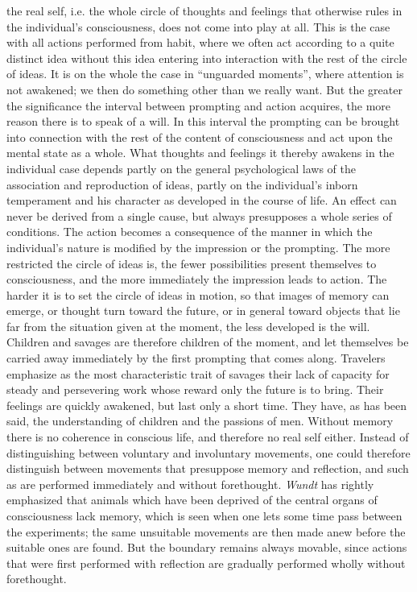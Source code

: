 \documentclass[12pt,a4paper,openany]{book}
\newcommand{\opage}[1]{\marginnote{\footnotesize\textit{[#1]}}}
\begin{document}
the real self, i.e. the whole circle of thoughts and feelings that otherwise
rules in the individual's consciousness, does not come into play at all. This
is the case with all actions performed from habit, where we often act
according to a quite distinct idea without this idea entering into interaction
with the rest of the circle of ideas. It is on the whole the case in
``unguarded moments'', where attention is not awakened; we then do something
other than we really want. But the greater the significance the interval
between prompting and action acquires, the more reason there is to speak of a
will. In this interval the prompting can be brought into connection with the
rest of the content of consciousness and act upon the mental state as a whole.
What thoughts and feelings \opage{115}it thereby awakens in the individual
case depends partly on the general psychological laws of the association and
reproduction of ideas, partly on the individual's inborn temperament and his
character as developed in the course of life. An effect can never be derived
from a single cause, but always presupposes a whole series of conditions. The
action becomes a consequence of the manner in which the individual's nature is
modified by the impression or the prompting. The more restricted the circle of
ideas is, the fewer possibilities present themselves to consciousness, and the
more immediately the impression leads to action. The harder it is to set the
circle of ideas in motion, so that images of memory can emerge, or thought
turn toward the future, or in general toward objects that lie far from the
situation given at the moment, the less developed is the will. Children and
savages are therefore children of the moment, and let themselves be carried
away immediately by the first prompting that comes along. Travelers emphasize
as the most characteristic trait of savages their lack of capacity for steady
and persevering work whose reward only the future is to bring. Their feelings
are quickly awakened, but last only a short time. They have, as has been said,
the understanding of children and the passions of men. Without memory there is
no coherence in conscious life, and therefore no real self either. Instead of
distinguishing between voluntary and involuntary movements, one could
therefore distinguish between movements that presuppose memory and reflection,
and such as are performed \opage{116}immediately and without forethought.
\emph{Wundt} has rightly emphasized that animals which have been deprived of
the central organs of consciousness lack memory, which is seen when one lets
some time pass between the experiments; the same unsuitable movements are then
made anew before the suitable ones are found. But the boundary remains always
movable, since actions that were first performed with reflection are gradually
performed wholly without forethought.
\end{document}
